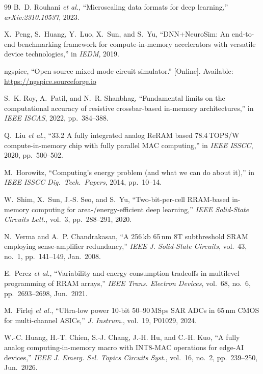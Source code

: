 \documentclass[conference]{IEEEtran}
\begin{document}
\begin{thebibliography}{99}
\balance
{}
B.~D. Rouhani \emph{et al.}, ``Microscaling data formats for deep learning,''
\emph{arXiv:2310.10537}, 2023.

X.~Peng, S.~Huang, Y.~Luo, X.~Sun, and S.~Yu, ``DNN+NeuroSim: An end-to-end
benchmarking framework for compute-in-memory accelerators with versatile device
technologies,'' in \emph{IEDM}, 2019.

ngspice, ``Open source mixed-mode circuit simulator.'' [Online]. Available:
\url{https://ngspice.sourceforge.io}

S.~K. Roy, A.~Patil, and N.~R. Shanbhag, ``Fundamental limits on the
computational accuracy of resistive crossbar-based in-memory architectures,''
in \emph{IEEE ISCAS}, 2022, pp.\ 384--388.

Q.~Liu \emph{et al.}, ``33.2 A fully integrated analog ReRAM based
78.4\,TOPS/W compute-in-memory chip with fully parallel MAC computing,'' in
\emph{IEEE ISSCC}, 2020, pp.\ 500--502.

M.~Horowitz, ``Computing's energy problem (and what we can do about it),'' in
\emph{IEEE ISSCC Dig.\ Tech.\ Papers}, 2014, pp.\ 10--14.

W.~Shim, X.~Sun, J.-S. Seo, and S.~Yu, ``Two-bit-per-cell RRAM-based in-memory
computing for area-/energy-efficient deep learning,'' \emph{IEEE Solid-State
Circuits Lett.}, vol.~3, pp.\ 288--291, 2020.

N.~Verma and A.~P. Chandrakasan, ``A 256\,kb 65\,nm 8T subthreshold SRAM
employing sense-amplifier redundancy,'' \emph{IEEE J. Solid-State Circuits},
vol.~43, no.~1, pp.\ 141--149, Jan.\ 2008.

E.~Perez \emph{et al.}, ``Variability and energy consumption tradeoffs in
multilevel programming of RRAM arrays,'' \emph{IEEE Trans. Electron Devices},
vol.~68, no.~6, pp.\ 2693--2698, Jun.\ 2021.

M.~Firlej \emph{et al.}, ``Ultra-low power 10-bit 50--90\,MSps SAR ADCs in
65\,nm CMOS for multi-channel ASICs,'' \emph{J. Instrum.}, vol.~19, P01029,
2024.

W.-C. Huang, H.-T. Chien, S.-J. Chang, J.-H. Hu, and C.-H. Kuo, ``A fully
analog computing-in-memory macro with INT8-MAC operations for edge-AI
devices,'' \emph{IEEE J. Emerg. Sel. Topics Circuits Syst.}, vol.~16, no.~2,
pp.\ 239--250, Jun.\ 2026.


\end{thebibliography}
\end{document}
